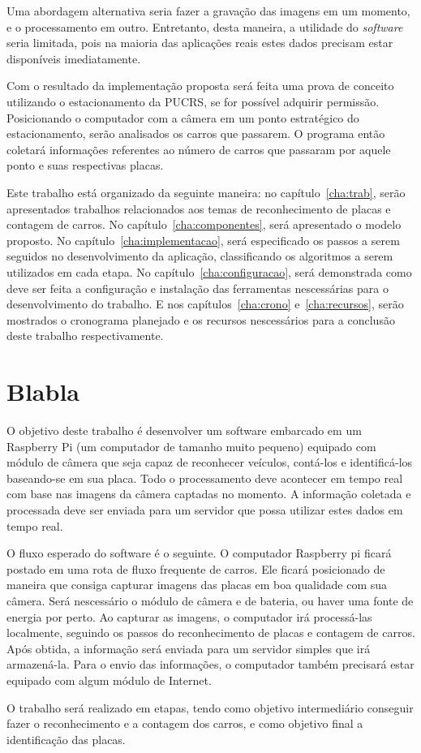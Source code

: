 Uma abordagem alternativa seria fazer a gravação das imagens em um momento, e o
processamento em outro. Entretanto, desta maneira, a utilidade do
\emph{software} seria limitada, pois na maioria das aplicações reais estes dados
precisam estar disponíveis imediatamente.

Com o resultado da implementação proposta será feita uma prova de conceito
utilizando o estacionamento da PUCRS, se for possível adquirir permissão.
Posicionando o computador com a câmera em um ponto estratégico do
estacionamento, serão analisados os carros que passarem. O programa então
coletará informações referentes ao número de carros que passaram por aquele ponto
e suas respectivas placas.

Este trabalho está organizado da seguinte maneira: no capítulo~\ref{cha:trab},
serão apresentados trabalhos relacionados aos temas de reconhecimento de placas
e contagem de carros. No capítulo~\ref{cha:componentes}, será apresentado o modelo
proposto. No capítulo~\ref{cha:implementacao}, será especificado os passos a serem
seguidos no desenvolvimento da aplicação, classificando os algoritmos a serem utilizados
em cada etapa. No capítulo~\ref{cha:configuracao}, será demonstrada como deve ser feita
a configuração e instalação das ferramentas nescessárias para o desenvolvimento do trabalho.
 E nos capítulos~\ref{cha:crono}  e~\ref{cha:recursos}, serão mostrados
o cronograma planejado e os recursos nescessários para a conclusão deste
trabalho respectivamente.

\section{Blabla}
\label{sec:bla}

O objetivo deste trabalho é desenvolver um software embarcado em um Raspberry Pi
(um computador de tamanho muito pequeno) equipado com módulo de câmera que seja
capaz de reconhecer veículos, contá-los e identificá-los baseando-se em sua
placa. Todo o processamento deve acontecer em tempo real com base nas imagens da
câmera captadas no momento. A informação coletada e processada deve ser enviada
para um servidor que possa utilizar estes dados em tempo real.

O fluxo esperado do software é o seguinte. O computador Raspberry pi ficará
postado em uma rota de fluxo frequente de carros. Ele ficará posicionado de
maneira que consiga capturar imagens das placas em boa qualidade com sua câmera.
Será nescessário o módulo de câmera e de bateria, ou haver uma fonte de energia
por perto. Ao capturar as imagens, o computador irá processá-las localmente,
seguindo os passos do reconhecimento de placas e contagem de carros.  Após
obtida, a informação será enviada para um servidor simples que irá armazená-la.
Para o envio das informações, o computador também precisará estar equipado com
algum módulo de Internet.

O trabalho será realizado em etapas, tendo como objetivo intermediário conseguir
fazer o reconhecimento e a contagem dos carros, e como objetivo final a
identificação das placas.

